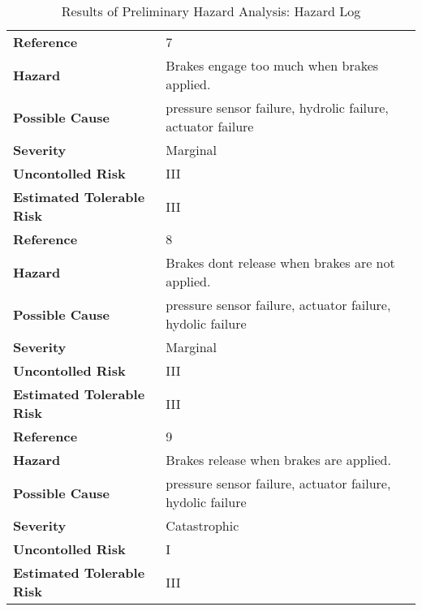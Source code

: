 \documentclass{article}
\begin{document}
\begin{table}[h!tbp]
\begin{center}
\begin{tabular}{|l|l|}
\hline
\textbf{Reference}&	7\\
\textbf{Hazard}&	Brakes engage too much when brakes applied.\\
\textbf{Possible Cause}&pressure sensor failure, hydrolic failure, actuator failure	\\
\textbf{Severity}&	Marginal\\
\textbf{Uncontolled Risk}&	III\\
\textbf{Estimated Tolerable Risk}&	III\\
\hline
\hline
\textbf{Reference}&	8\\
\textbf{Hazard}&	Brakes dont release when brakes are not applied.\\
\textbf{Possible Cause}&	pressure sensor failure, actuator failure, hydolic failure\\
\textbf{Severity}&	Marginal\\
\textbf{Uncontolled Risk}&	III\\
\textbf{Estimated Tolerable Risk}&	III\\
\hline
\hline
\textbf{Reference}&	9\\
\textbf{Hazard}&	Brakes release when brakes are applied.\\
\textbf{Possible Cause}&	pressure sensor failure, actuator failure, hydolic failure\\
\textbf{Severity}&	Catastrophic\\
\textbf{Uncontolled Risk}&	I\\
\textbf{Estimated Tolerable Risk}&	III\\
\hline
\hline
\end{tabular}
\end{center}
\caption{Results of Preliminary Hazard Analysis: Hazard Log}
\label{fig:HazardLogTable3}
\end{table}
\end{document}
